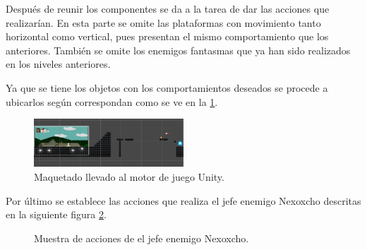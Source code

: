 Después de reunir los componentes se da a la tarea de dar las acciones que realizarían. En esta parte se omite las plataformas con movimiento tanto horizontal como vertical, pues presentan el mismo comportamiento que los anteriores. También se omite los enemigos fantasmas que ya han sido realizados en los niveles anteriores.

Ya que se tiene los objetos con los comportamientos deseados se procede a ubicarlos según correspondan como se ve en la \ref{fig:n504}.
\begin{figure}
	\centering
	\caption{Maquetado llevado al motor de juego Unity.}
	\label{fig:n504}
	\includegraphics[width=0.5\textwidth]{03TrabajoRealizado/DocProduccionR/imagenes/n9/n902.png}
\end{figure}

Por último se establece las acciones que realiza el jefe enemigo Nexoxcho descritas en la siguiente figura \ref{fig:n905}.
\begin{figure}[htbp]
	\centering
	\caption{Muestra de acciones de el jefe enemigo Nexoxcho.} \label{fig:n905}
\end{figure}
